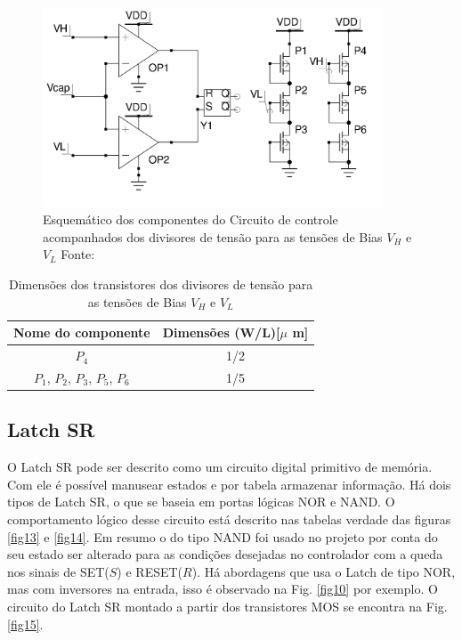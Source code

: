 \begin{figure}[htb]
	\centering
	\includegraphics[width=0.9\textwidth]{figuras/controle.png}
	\caption{Esquemático dos componentes do Circuito de controle acompanhados dos divisores de tensão para as tensões de Bias $V_H$ e $V_L$ Fonte:\cite{artigo_principal} }
	\label{fig12}
\end{figure}

\begin{table}[htb]
\centering
\begin{tabular}{c|c}
\hline 
\hline 
\textbf{Nome do componente} & \textbf{Dimensões (W/L)[$\mu$ m]} \\ 
\hline 
\hline 
$P_4$ & 1/2 \\ 
\hline 
$P_1$, $P_2$, $P_3$, $P_5$, $P_6$  & 1/5 \\ 
\hline 
\end{tabular} 
\caption{Dimensões dos transistores dos divisores de tensão para as tensões de Bias $V_H$ e $V_L$}
\label{tab:control}
\end{table}

\subsection{Latch SR}

O Latch SR pode ser descrito como um circuito digital primitivo de memória. Com ele é possível manusear estados e por tabela armazenar informação. Há dois tipos de Latch SR, o que se baseia em portas lógicas NOR e NAND.
O comportamento lógico desse circuito está descrito nas tabelas verdade das figuras \ref{fig13} e \ref{fig14}. Em resumo o do tipo NAND foi usado no projeto por conta do seu estado ser alterado para as condições desejadas no controlador com a queda nos sinais de SET($S$) e RESET($R$). Há abordagens que usa o Latch de tipo NOR, mas com inversores na entrada, isso é observado na Fig. \ref{fig10} por exemplo. 
O circuito do Latch SR montado a partir dos transistores MOS se encontra na Fig. \ref{fig15}. 

